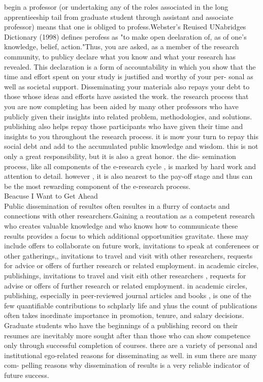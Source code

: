 \documentclass{book}
\begin{document}
begin a professor (or undertaking any of the roles associated in the long apprentieeship
tail from graduate student through assistant and associate professor) means that one
is obliged to profess.Webster's Reuised UNabridges Dictionary (1998) defines perofess as "to
make  open deelaration of, as of one's knowledge, belief, action."Thus, you are asked,
as a member of the  research community, to publicy declare what you know and what
your research has revealed. This declaration is a form of accountability in which you 
show that the time and effort spent on your study is justified and worthy of your per-
sonal as well as societal support.
Disseminating your materials also repays your debt to those whose ideas and
efforts have assisted the work. the research process that you are now completing has
been aided by many other professors  who have publicly given their insights into related
problem, methodologies, and solutions. publishing also helps repay those participants
who have given their time and insights to you throughout the research process. it is 
mow your turn to repay this social debt and add to the accumulated public knowledge
and wisdom. this is not only a great responsibility, but it is also a great honor. the dis-
semination process, like all components of the  e-research cycle , is marked by hard
work and attention to detail. however , it is also nearest to the pay-off stage and thus
can be the most rewarding component of the e-research process.\\

Beacuse I Want to Get Ahead\\

Public dissemination of resultes often resultes in a flurry of contacts and connections with
other researchers.Gaining a reoutation as a competent research who creates  valuable
knowledge and who knows how to communicate these results provides a focus to which 
additional opportunities gravitate. these may include offers to collaborate on future
work, invitations to speak at conferenees or other gatherings,, invitations to travel and
visit with other researchers, requests for advice or offers of further research or related
employment. in academic circles, publishings, invitations to travel and
visit eith other researchers , requests for advise or offers of further research or related
employment. in academic circles, publishing, especially in peer-reviewed journal articles
and books , is one  of the few quantifiable contributions to schplarly life and yhus the
count of publications often takes inordinate importance in promotion, tenure, and 
salary decisions. Graduate students who have the beginnings of a publishing record on 
their resumes are inevitably more sought after than those who can show competence
only through successful completion of courses. there are a variety of personal and 
institutional ego-related reasons for disseminating as well. in sum there are many com-
pelling reasons why dissemination of results is a very reliable indicator of future success.\\
\end{document}
